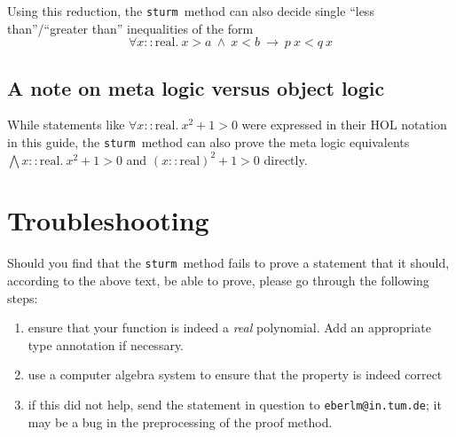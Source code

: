 \documentclass[11pt,a4paper,oneside]{article}
\newcommand{\sturm}{\texttt{sturm}}
\newcommand{\real}{\textrm{real}}
\begin{document}
Using this reduction, the \sturm\ method can also decide single \enquote{less than}/\enquote{greater than} inequalities of the form 
$$\forall x::\real.\ x > a\ \wedge\ x < b\ \longrightarrow\ p\ x < q\ x$$

\subsection{A note on meta logic versus object logic}

While statements like $\forall x::\real.\ x^2+1>0$ were expressed in their HOL notation in this guide, the \sturm\ method can also prove the meta logic equivalents $\bigwedge x::\real.\ x^2+1>0$ and $(x::\real)^2+1>0$ directly.

\section{Troubleshooting}

Should you find that the \sturm\ method fails to prove a statement that it should, according to the above text, be able to prove, please go through the following steps:
\begin{enumerate}
\item ensure that your function is indeed a \emph{real} polynomial. Add an appropriate type annotation if necessary.
\item use a computer algebra system to ensure that the property is indeed correct
\item if this did not help, send the statement in question to \texttt{eberlm@in.tum.de}; it may be a bug in the preprocessing of the proof method.
\end{enumerate}
\end{document}
